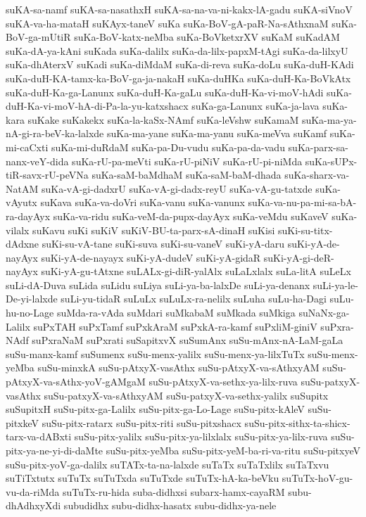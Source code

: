 {suKA-sa-namf
suKA-sa-nasathxH
suKA-sa-na-va-ni-kakx-lA-gadu
suKA-siVnoV
suKA-va-ha-mataH
suKAyx-taneV
suKa
suKa-BoV-gA-paR-Na-sAthxnaM
suKa-BoV-ga-mUtiR
suKa-BoV-katx-neMba
suKa-BoVketxrXV
suKaM
suKadAM
suKa-dA-ya-kAni
suKada
suKa-dalilx
suKa-da-lilx-papxM-tAgi
suKa-da-lilxyU
suKa-dhAterxV
suKadi
suKa-diMdaM
suKa-di-reva
suKa-doLu
suKa-duH-KAdi
suKa-duH-KA-tamx-ka-BoV-ga-ja-nakaH
suKa-duHKa
suKa-duH-Ka-BoVkAtx
suKa-duH-Ka-ga-Lanunx
suKa-duH-Ka-gaLu
suKa-duH-Ka-vi-moV-hAdi
suKa-duH-Ka-vi-moV-hA-di-Pa-la-yu-katxshacx
suKa-ga-Lanunx
suKa-ja-lava
suKa-kara
suKake
suKakekx
suKa-la-kaSx-NAmf
suKa-leVshw
suKamaM
suKa-ma-ya-nA-gi-ra-beV-ka-lalxde
suKa-ma-yane
suKa-ma-yanu
suKa-meVva
suKamf
suKa-mi-caCxti
suKa-mi-duRdaM
suKa-pa-Du-vudu
suKa-pa-da-vadu
suKa-parx-sa-nanx-veY-dida
suKa-rU-pa-meVti
suKa-rU-piNiV
suKa-rU-pi-niMda
suKa-sUPx-tiR-savx-rU-peVNa
suKa-saM-baMdhaM
suKa-saM-baM-dhada
suKa-sharx-va-NatAM
suKa-vA-gi-dadxrU
suKa-vA-gi-dadx-reyU
suKa-vA-gu-tatxde
suKa-vAyutx
suKava
suKa-va-doVri
suKa-vanu
suKa-vanunx
suKa-va-nu-pa-mi-sa-bA-ra-dayAyx
suKa-va-ridu
suKa-veM-da-pupx-dayAyx
suKa-veMdu
suKaveV
suKa-vilalx
suKavu
suKi
suKiV
suKiV-BU-ta-parx-sA-dinaH
suKisi
suKi-su-titx-dAdxne
suKi-su-vA-tane
suKi-suva
suKi-su-vaneV
suKi-yA-daru
suKi-yA-de-nayAyx
suKi-yA-de-nayayx
suKi-yA-dudeV
suKi-yA-gidaR
suKi-yA-gi-deR-nayAyx
suKi-yA-gu-tAtxne
suLALx-gi-diR-yalAlx
suLaLxlalx
suLa-litA
suLeLx
suLi-dA-Duva
suLida
suLidu
suLiya
suLi-ya-ba-lalxDe
suLi-ya-denanx
suLi-ya-le-De-yi-lalxde
suLi-yu-tidaR
suLuLx
suLuLx-ra-nelilx
suLuha
suLu-ha-Dagi
suLu-hu-no-Lage
suMda-ra-vAda
suMdari
suMkabaM
suMkada
suMkiga
suNaNx-ga-Lalilx
suPxTAH
suPxTamf
suPxkAraM
suPxkA-ra-kamf
suPxliM-giniV
suPxra-NAdf
suPxraNaM
suPxrati
suSapitxvX
suSumAnx
suSu-mAnx-nA-LaM-gaLa
suSu-manx-kamf
suSumenx
suSu-menx-yalilx
suSu-menx-ya-lilxTuTx
suSu-menx-yeMba
suSu-minxkA
suSu-pAtxyX-vasAthx
suSu-pAtxyX-va-sAthxyAM
suSu-pAtxyX-va-sAthx-yoV-gAMgaM
suSu-pAtxyX-va-sethx-ya-lilx-ruva
suSu-patxyX-vasAthx
suSu-patxyX-va-sAthxyAM
suSu-patxyX-va-sethx-yalilx
suSupitx
suSupitxH
suSu-pitx-ga-Lalilx
suSu-pitx-ga-Lo-Lage
suSu-pitx-kAleV
suSu-pitxkeV
suSu-pitx-ratarx
suSu-pitx-riti
suSu-pitxshacx
suSu-pitx-sithx-ta-shicx-tarx-va-dABxti
suSu-pitx-yalilx
suSu-pitx-ya-lilxlalx
suSu-pitx-ya-lilx-ruva
suSu-pitx-ya-ne-yi-di-daMte
suSu-pitx-yeMba
suSu-pitx-yeM-ba-ri-va-ritu
suSu-pitxyeV
suSu-pitx-yoV-ga-dalilx
suTATx-ta-na-lalxde
suTaTx
suTaTxlilx
suTaTxvu
suTiTxtutx
suTuTx
suTuTxda
suTuTxde
suTuTx-hA-ka-beVku
suTuTx-hoV-gu-vu-da-riMda
suTuTx-ru-hida
suba-didhxsi
subarx-hamx-cayaRM
subu-dhAdhxyXdi
subudidhx
subu-didhx-hasatx
subu-didhx-ya-nele
}
